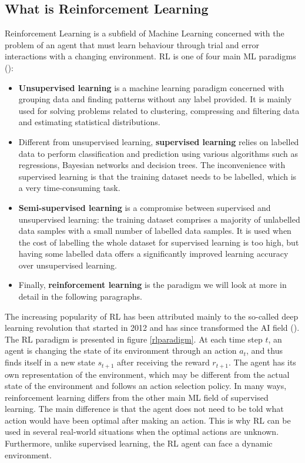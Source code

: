 \subsection{What is Reinforcement Learning}
Reinforcement Learning is a subfield of Machine Learning concerned with the problem of an agent that must learn behaviour through trial and error interactions with a changing environment. RL is one of four main ML paradigms (\cite{Alloghani2020}):
\begin{itemize}
	\item \textbf{Unsupervised learning} is a machine learning paradigm concerned with grouping data and finding patterns without any label provided. It is mainly used for solving problems related to clustering, compressing and filtering data and estimating statistical distributions.
	\item Different from unsupervised learning, \textbf{supervised learning} relies on labelled data to perform classification and prediction using various algorithms such as regressions, Bayesian networks and decision trees. The inconvenience with supervised learning is that the training dataset needs to be labelled, which is a very time-consuming task.
	\item \textbf{Semi-supervised learning} is a compromise between supervised and unsupervised learning: the training dataset comprises a majority of unlabelled data samples with a small number of labelled data samples. It is used when the cost of labelling the whole dataset for supervised learning is too high, but having some labelled data offers a significantly improved learning accuracy over unsupervised learning.
	\item Finally, \textbf{reinforcement learning} is the paradigm we will look at more in detail in the following paragraphs.
\end{itemize}


The increasing popularity of RL has been attributed mainly to the so-called deep learning revolution that started in 2012 and has since transformed the AI field (\cite{sejnowski2018deep}). \newline
The RL paradigm is presented in figure \ref{rlparadigm}. At each time step $t$, an agent is changing the state of its environment through an action $a_t$, and thus finds itself in a new state $s_{t+1}$ after receiving the reward $r_{t+1}$. The agent has its own representation of the environment, which may be different from the actual state of the environment and follows an action selection policy. \newline
In many ways, reinforcement learning differs from the other main ML field of supervised learning. The main difference is that the agent does not need to be told what action would have been optimal after making an action. This is why RL can be used in several real-world situations when the optimal actions are unknown. Furthermore, unlike supervised learning, the RL agent can face a dynamic environment. 

